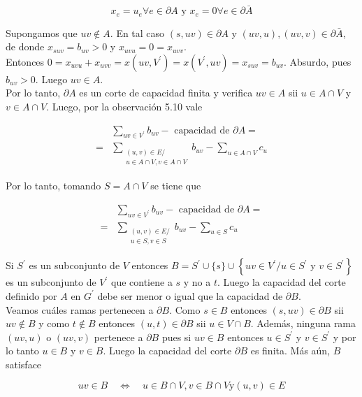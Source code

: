 \documentclass[10pt]{article}
\begin{document}
$$
x_{e}=u_{e} \forall e \in \partial A \text { y } x_{e}=0 \forall e \in \partial \bar{A}
$$

Supongamos que $u v \notin A$. En tal caso $(s, u v) \in \partial A$ y $(u v, u),(u v, v) \in \partial \bar{A}$, de donde $x_{s u v}=b_{u v}>0$ y $x_{u v u}=0=x_{u v v}$.\\
Entonces $0=x_{u v u}+x_{u v v}=x\left(u v, V^{\prime}\right)=x\left(V^{\prime}, u v\right)=x_{s u v}=b_{u v}$. Absurdo, pues $b_{u v}>0$. Luego $u v \in A$.\\
Por lo tanto, $\partial A$ es un corte de capacidad finita y verifica $u v \in A$ sii $u \in A \cap V$ y $v \in A \cap V$. Luego, por la observación 5.10 vale

$$
\begin{aligned}
& \sum_{u v \in V^{\prime}} b_{u v}-\text { capacidad de } \partial A= \\
= & \sum_{\substack{(u, v) \in E / \\
u \in A \cap V, v \in A \cap V}} b_{u v}-\sum_{u \in A \cap V} c_{u}
\end{aligned}
$$

Por lo tanto, tomando $S=A \cap V$ se tiene que

$$
\begin{aligned}
& \sum_{u v \in V^{\prime}} b_{u v}-\text { capacidad de } \partial A= \\
= & \sum_{\substack{(u, v) \in E / \\
u \in S, v \in S}} b_{u v}-\sum_{u \in S} c_{u}
\end{aligned}
$$

Si $S^{\prime}$ es un subconjunto de $V$ entonces $B=S^{\prime} \cup\{s\} \cup\left\{u v \in V^{\prime} / u \in S^{\prime}\right.$ y $\left.v \in S^{\prime}\right\}$ es un subconjunto de $V^{\prime}$ que contiene a $s$ y no a $t$. Luego la capacidad del corte definido por $A$ en $G^{\prime}$ debe ser menor o igual que la capacidad de $\partial B$.\\
Veamos cuáles ramas pertenecen a $\partial B$. Como $s \in B$ entonces $(s, u v) \in \partial B$ sii $u v \notin B$ y como $t \notin B$ entonces $(u, t) \in \partial B$ sii $u \in V \cap B$. Además, ninguna rama $(u v, u)$ o $(u v, v)$ pertenece a $\partial B$ pues si $u v \in B$ entonces $u \in S^{\prime}$ y $v \in S^{\prime}$ y por lo tanto $u \in B$ y $v \in B$. Luego la capacidad del corte $\partial B$ es finita. Más aún, $B$ satisface

$$
u v \in B \quad \Longleftrightarrow \quad u \in B \cap V, v \in B \cap V \mathrm{y}(u, v) \in E
$$
\end{document}
